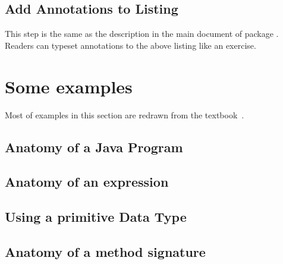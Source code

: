 \documentclass[full]{l3doc}
\newcommand{\inputlisting}[1]{%
}
\begin{document}
\subsection{Add Annotations to Listing}
This step is the same as the description in the main document of package .
Readers can typeset annotations to the above listing like an exercise.






\section{Some examples}

Most of examples in this section are redrawn from the textbook~\autocite{sedgewick_wayne_2016}.

\subsection{Anatomy of a Java Program~\autocite[5]{sedgewick_wayne_2016}}
\begin{thinmargin}
\inputlisting{java-program.tex}
\end{thinmargin}



\subsection{Anatomy of an expression~\autocite[17]{sedgewick_wayne_2016}}
\begin{thinmargin}
    \inputlisting{java-expression.tex}
\end{thinmargin}



\subsection{Using a primitive Data Type~\autocite[17]{sedgewick_wayne_2016}}

\subsection{Anatomy of a method signature~\autocite[30]{sedgewick_wayne_2016}}
\end{document}
